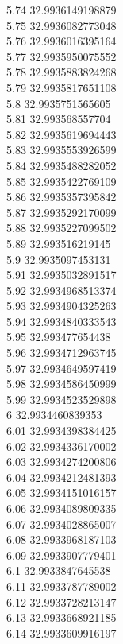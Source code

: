 {5.74	32.9936149198879\\
5.75	32.9936082773048\\
5.76	32.9936016395164\\
5.77	32.9935950075552\\
5.78	32.9935883824268\\
5.79	32.9935817651108\\
5.8	32.9935751565605\\
5.81	32.993568557704\\
5.82	32.9935619694443\\
5.83	32.9935553926599\\
5.84	32.9935488282052\\
5.85	32.9935422769109\\
5.86	32.9935357395842\\
5.87	32.9935292170099\\
5.88	32.9935227099502\\
5.89	32.993516219145\\
5.9	32.9935097453131\\
5.91	32.9935032891517\\
5.92	32.9934968513374\\
5.93	32.9934904325263\\
5.94	32.9934840333543\\
5.95	32.993477654438\\
5.96	32.9934712963745\\
5.97	32.9934649597419\\
5.98	32.9934586450999\\
5.99	32.9934523529898\\
6	32.9934460839353\\
6.01	32.9934398384425\\
6.02	32.9934336170002\\
6.03	32.9934274200806\\
6.04	32.9934212481393\\
6.05	32.9934151016157\\
6.06	32.9934089809335\\
6.07	32.9934028865007\\
6.08	32.9933968187103\\
6.09	32.9933907779401\\
6.1	32.9933847645538\\
6.11	32.9933787789002\\
6.12	32.9933728213147\\
6.13	32.9933668921185\\
6.14	32.9933609916197\\
}
